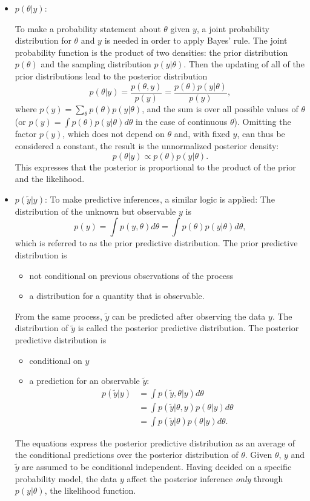 \documentclass[a4, 12pt]{article}
\begin{document}
\begin{itemize}
\item $p(\theta|y)$:

To make a probability statement about $\theta$ given $y$, a joint probability distribution for $\theta$ and $y$ is needed in order to apply Bayes' rule. The joint probability function is  the product of two densities: the prior distribution $p(\theta)$ and the sampling distribution $p(y|\theta)$.
Then the updating of all of the prior distributions lead to the posterior distribution $$p(\theta|y)=\frac{p(\theta,y)}{p(y)}=\frac{p(\theta)p(y|\theta)}{p(y)},$$ where $p(y)=\sum_\theta{p(\theta)p(y|\theta)}$, and the sum is over all possible values of $\theta$ (or $p(y)=\int p(\theta)p(y|\theta)d\theta$ in the case of continuous $\theta$). Omitting the factor $p(y)$, which does not depend on $\theta$ and, with fixed $y$, can thus be considered a constant, the result is the unnormalized posterior density:
$$p(\theta|y) \propto p(\theta)p(y|\theta).$$ This expresses that the posterior is proportional to the product of the prior and the likelihood.

\item $p(\tilde y|y)$:
To make predictive inferences, a similar logic is applied:
The distribution of the unknown but observable $y$ is
$$p(y)=\int p(y,\theta)d\theta=\int p(\theta)p(y|\theta)d\theta,$$ which is referred to as the prior predictive distribution. The prior predictive distribution is
\begin{itemize}
\item not conditional on previous observations of the process
\item a distribution for a quantity that is observable.
\end{itemize}
From the same process, $\tilde{y}$ can be predicted after observing the data $y$.
The distribution of $\tilde{y}$ is called the posterior predictive distribution. The posterior predictive distribution is
\begin{itemize}
\item conditional on $y$
\item a prediction for an observable $\tilde y:$
\begin{align*}
p(\tilde{y}|y) & =\int p(\tilde{y},\theta|y)d\theta \\
& = \int p(\tilde{y}|\theta,y)p(\theta|y)d\theta \\
& = \int p(\tilde{y}|\theta)p(\theta|y)d\theta.
\end{align*}
\end{itemize}
The equations express the posterior predictive distribution as an average of the conditional predictions over the posterior distribution of $\theta$. Given $\theta$, $y$ and $\tilde{y}$ are assumed to be conditional independent.
Having decided on a specific probability model, the data $y$ affect the posterior inference \emph{only} through $p(y|\theta)$, the likelihood function.
\end{itemize}
\end{document}
